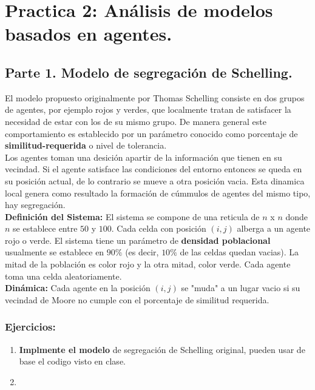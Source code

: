 \documentclass[12pt]{article}
\begin{document}

{\color{red} \section*{Practica 2: Análisis de modelos basados en agentes.}}

{\color{blue} \subsection*{Parte 1. Modelo de segregación de Schelling.}}
\vspace{1em}

El modelo propuesto originalmente por Thomas Schelling consiste en dos grupos de agentes, por ejemplo rojos y verdes, que localmente tratan de satisfacer la necesidad de estar con los
de su mismo grupo. De manera general este comportamiento es establecido por un parámetro conocido como porcentaje de \textbf{similitud-requerida} o nivel de tolerancia.\\

Los agentes toman una desición apartir de la información que tienen en su vecindad. Si el agente satisface las condiciones del entorno entonces se queda en su posición actual, de lo contrario
se mueve a otra posición vacia. Esta dinamica local genera como resultado la formación de cúmmulos de agentes del mismo tipo, hay segregación.\\

\textbf{Definición del Sistema:} El sistema se compone de una reticula de $n$ x $n$ donde $n$ se establece entre $50$ y $100$.
Cada celda con posición $(i,j)$ alberga a un agente rojo o verde. El sistema tiene un parámetro de \textbf{densidad poblacional} usualmente se establece en $90\%$ (es decir, $10\%$ de las celdas quedan vacias).
La mitad de la población es color rojo y la otra mitad, color verde. Cada agente toma una celda aleatoriamente.\\

\textbf{Dinámica:} Cada agente en la posición $(i,j)$ se "muda" a un lugar vacio si su vecindad de Moore no cumple con el porcentaje de similitud requerida.\\

{\color{blue} \subsubsection*{Ejercicios:}}

\begin{enumerate}
    \item \textbf{Implmente el modelo} de segregación de Schelling original, pueden usar de base el codigo visto en clase.
    \item 
\end{enumerate}
\end{document}
